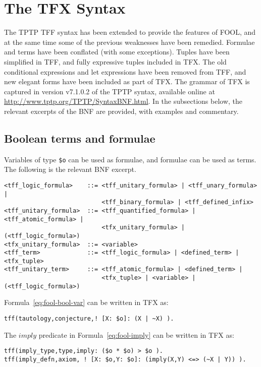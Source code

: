 \documentclass{easychair}
\begin{document}
\section{The TFX Syntax}
\label{TFX}

The TPTP TFF syntax has been extended to provide the features of FOOL,
and at the same time some of the previous weaknesses have been remedied.
Formulae and terms have been conflated (with some exceptions).
Tuples have been simplified in TFF, and fully expressive tuples included in 
TFX. 
The old conditional expressions and let expressions have been removed from 
TFF, and new elegant forms have been included as part of TFX. 
The grammar of TFX is captured in version v7.1.0.2 of the TPTP syntax,
available online at \url{http://www.tptp.org/TPTP/SyntaxBNF.html}.
In the subsections below, the relevant excerpts of the BNF are provided,
with examples and commentary.

\subsection{Boolean terms and formulae}

Variables of type {\tt \$o} can be used as formulae, and formulae can be 
used as terms. 
The following is the relevant BNF excerpt.
\begin{verbatim}
<tff_logic_formula>    ::= <tff_unitary_formula> | <tff_unary_formula> |
                           <tff_binary_formula> | <tff_defined_infix>
<tff_unitary_formula>  ::= <tff_quantified_formula> | <tff_atomic_formula> |
                           <tfx_unitary_formula> | (<tff_logic_formula>)
<tfx_unitary_formula>  ::= <variable>
<tff_term>             ::= <tff_logic_formula> | <defined_term> | <tfx_tuple>
<tff_unitary_term>     ::= <tff_atomic_formula> | <defined_term> |
                           <tfx_tuple> | <variable> | (<tff_logic_formula>)
\end{verbatim}

Formula~\ref{eq:fool-bool-var} can be written in TFX as:
\begin{verbatim}
tff(tautology,conjecture,! [X: $o]: (X | ~X) ).
\end{verbatim}

The $\mathit{imply}$ predicate in Formula~\ref{eq:fool-imply} can 
be written in TFX as:
\begin{verbatim}
tff(imply_type,type,imply: ($o * $o) > $o ).
tff(imply_defn,axiom, ! [X: $o,Y: $o]: (imply(X,Y) <=> (~X | Y)) ).
\end{verbatim}
\end{document}

